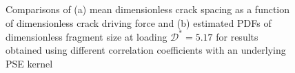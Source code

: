 \begin{figure}[htbp!]
\begin{subfigure}[b]{0.475\textwidth}
    \caption{}
  \end{subfigure}
  \caption[Fragment statistics for different correlation coefficients with a PSE kernel.]{Comparisons of (a) mean dimensionless crack spacing as a function of dimensionless crack driving force and (b) estimated PDFs of dimensionless fragment size at loading $\mathcal{D}^* = 5.17$ for results obtained using different correlation coefficients with an underlying PSE kernel}
  \label{fig: Chapter4/2D/statistics_sensitivity_sqexp}
\end{figure}

